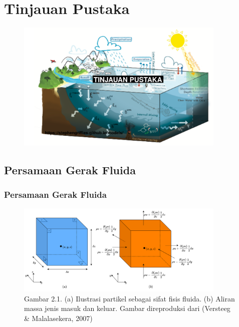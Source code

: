 \documentclass{beamer}
\begin{document}
\section{Tinjauan Pustaka}
\begin{frame}
	\centering
	\begin{figure}[H]
		\centering
		\includegraphics[width=10cm]{Bg_2}
	\end{figure}
\end{frame}
\subsection{Persamaan Gerak Fluida}
\begin{frame}
	\frametitle{Persamaan Gerak Fluida}
	\begin{figure}[H]
		\centering
		\includegraphics[width=10cm]{cube.png}
		\captionsetup{labelformat=empty}
		\caption{Gambar 2.1. (a) Ilustrasi partikel sebagai sifat fisis fluida. (b) Aliran massa jenis masuk dan keluar. Gambar direproduksi dari (Versteeg \& Malalasekera, 2007)}
		\label{fig:cube}
	\end{figure}
\end{frame}
\end{document}
